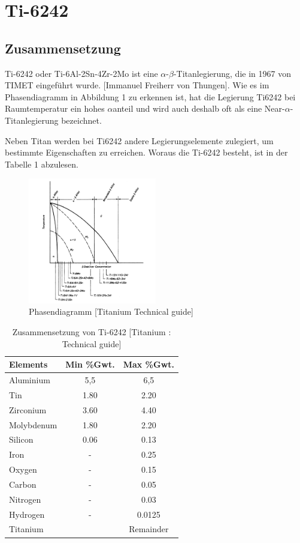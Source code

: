 \section{Ti-6242}

\subsection{Zusammensetzung}
Ti-6242 oder Ti-6Al-2Sn-4Zr-2Mo ist eine $\alpha$-$\beta$-Titanlegierung, die  in 1967 von TIMET eingeführt wurde. [Immanuel Freiherr von Thungen]. 
Wie es im Phasendiagramm in Abbildung 1 zu erkennen ist, hat die Legierung Ti6242 bei Raumtemperatur ein hohes $\alpha$anteil und wird auch deshalb oft als eine Near-$\alpha$-Titanlegierung bezeichnet.

Neben Titan werden bei Ti6242 andere Legierungselemente zulegiert, um bestimmte Eigenschaften zu erreichen. Woraus die Ti-6242 besteht, ist in der Tabelle 1 abzulesen.


\begin{figure}[H]
	\centering
	\includegraphics[width=0.5\textwidth]{Bilder/Phasendiagram}
	\caption{Phasendiagramm [Titanium Technical guide]}
	\label{PD-Ti6242}
\end{figure}





\begin{table}[H]
	
	\centering	
	\begin{tabular}{|l |c |c|}
		\hline
		\centering
		\hspace{20ex}Elements \hspace{20ex} & Min \%Gwt. & Max \%Gwt.\\
		\hline
		Aluminium&5,5&6,5\\
		Tin&1.80&2.20\\
		Zirconium&3.60&4.40\\
		Molybdenum&1.80&2.20\\
		Silicon &0.06&0.13\\
		Iron&-&0.25\\
		Oxygen&-&0.15\\
		Carbon&	-&	0.05\\
		Nitrogen&-&0.03\\
		Hydrogen&-&0.0125\\
		
		Titanium &&Remainder\\
		\hline
	\end{tabular}
	\caption{Zusammensetzung von Ti-6242 [Titanium : Technical guide]}
\end{table}


